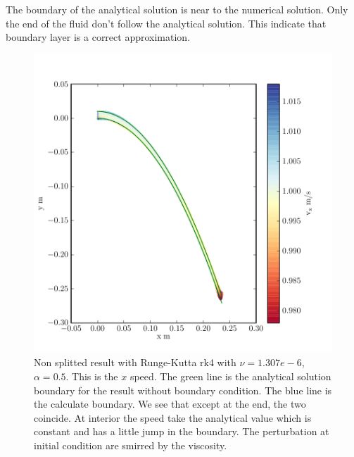 The boundary of the analytical solution is near to the numerical solution.
Only the end of the fluid don't follow the analytical solution.
This indicate that boundary layer is a correct approximation.
\begin{figure}
	\includegraphics{topology/lateral_jet/plot_8__1_186.pdf}
	\caption{Non splitted result with Runge-Kutta rk4 with $\nu=1.307e-6$, $\alpha=0.5$.
	This is the $x$ speed.
	The green line is the analytical solution boundary for the result without boundary condition.
	The blue line is the calculate boundary.
	We see that except at the end, the two coincide.
	At interior the speed take the analytical value which is constant and has a little jump in the boundary.
	The perturbation at initial condition are smirred by the viscosity.}
	\label{topo:extrap:lateral:8_1}
\end{figure}

